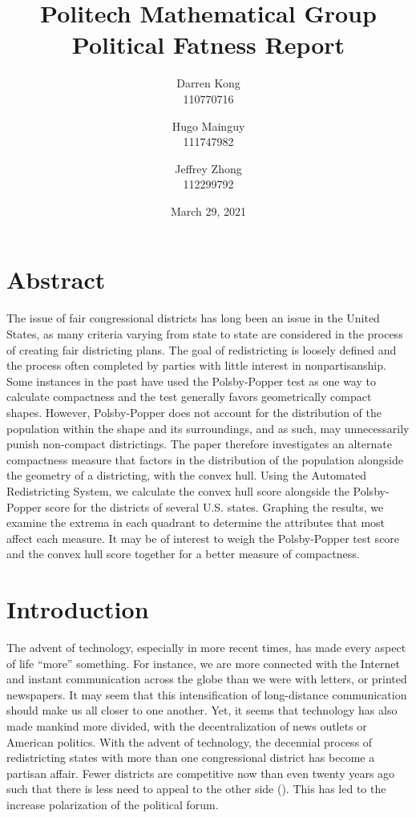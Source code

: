 \documentclass[letterpaper]{article}
\title{
	\textbf{Politech Mathematical Group} \\ 
	\vspace{2ex} 
	Political Fatness Report
	\vspace{2ex}
}
\author{
	Darren Kong \\ 110770716
	\and 
	Hugo Mainguy \\ 111747982
	\and 
	Jeffrey Zhong \\ 112299792
	\vspace{3ex}
}
\date{March 29, 2021}
\begin{document}
\begin{titlepage}
\maketitle
\thispagestyle{empty}
\end{titlepage}

\section{Abstract}
The issue of fair congressional districts has long been an issue in the United States, as many criteria varying from state to state are considered in the process of creating fair districting plans. The goal of redistricting is loosely defined and the process often completed by parties with little interest in nonpartisanship. Some instances in the past have used the Polsby-Popper test as one way to calculate compactness and the test generally favors geometrically compact shapes. However, Polsby-Popper does not account for the distribution of the population within the shape and its surroundings, and as such, may unnecessarily punish non-compact districtings. The paper therefore investigates an alternate compactness measure that factors in the distribution of the population alongside the geometry of a districting, with the convex hull. Using the Automated Redistricting System, we calculate the convex hull score alongside the Polsby-Popper score for the districts of several U.S. states. Graphing the results, we examine the extrema in each quadrant to determine the attributes that most affect each measure. It may be of interest to weigh the Polsby-Popper test score and the convex hull score together for a better measure of compactness. 


\section{Introduction}

The advent of technology, especially in more recent times, has made every aspect of life “more” something. For instance, we are more connected with the Internet and instant communication across the globe than we were with letters, or printed newspapers. It may seem that this intensification of long-distance communication should make us all closer to one another. Yet, it seems that technology has also made mankind more divided, with the decentralization of news outlets or American politics. With the advent of technology, the decennial process of redistricting states with more than one congressional district has become a partisan affair. Fewer districts are competitive now than even twenty years ago such that there is less need to appeal to the other side (\cite{cook}). This has led to the increase polarization of the political forum.
\end{document}
